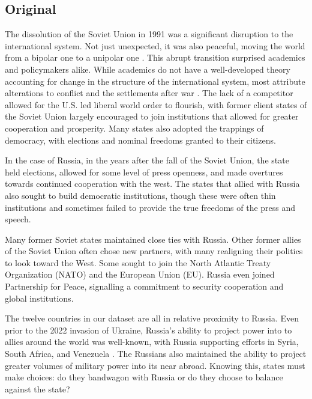 \documentclass[12pt]{article}
\begin{document}

\subsection*{Original}

The dissolution of the Soviet Union in 1991 was a significant disruption to the international system. Not just unexpected, it was also peaceful, moving the world from a bipolar one to a unipolar one \citep{waltz_theory_2010, monteiro_theory_2014}. This abrupt transition surprised academics and policymakers alike. While academics do not have a well-developed theory accounting for change in the structure of the international system, most attribute alterations to conflict and the settlements after war \citep{waltz_theory_2010, ikenberry_after_2001}. The lack of a competitor allowed for the U.S. led liberal world order to flourish, with former client states of the Soviet Union largely encouraged to join institutions that allowed for greater cooperation and prosperity. Many states also adopted the trappings of democracy, with elections and nominal freedoms granted to their citizens. 

In the case of Russia, in the years after the fall of the Soviet Union, the state held elections, allowed for some level of press openness, and made overtures towards continued cooperation with the west. The states that allied with Russia also sought to build democratic institutions, though these were often thin institutions and sometimes failed to provide the true freedoms of the press and speech. 

Many former Soviet states maintained close ties with Russia. Other former allies of the Soviet Union often chose new partners, with many realigning their politics to look toward the West. Some sought to join the North Atlantic Treaty Organization (NATO) and the European Union (EU). Russia even joined Partnership for Peace, signalling a commitment to security cooperation and global institutions.  

The twelve countries in our dataset are all in relative proximity to Russia. Even prior to the 2022 invasion of Ukraine, Russia's ability to project power into to allies around the world was well-known, with Russia supporting efforts in Syria, South Africa, and Venezuela \citep{radin_what_2019, charap_understanding_2019, bbc_us-russian_2018}. The Russians also maintained the ability to project greater volumes of military power into its near abroad. Knowing this, states must make choices: do they bandwagon with Russia or do they choose to balance against the state? 
\end{document}
